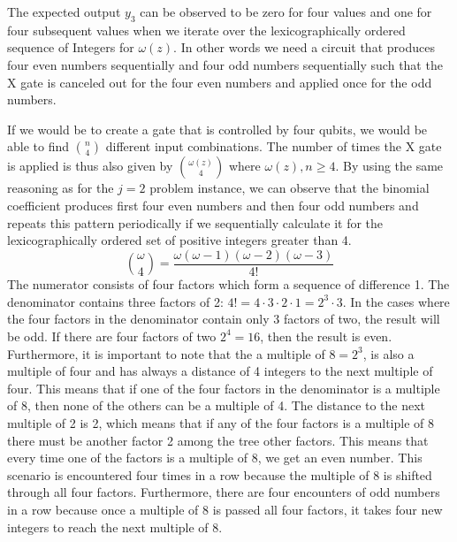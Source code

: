 \documentclass[12pt,a4paper]{article}
\begin{document}
The expected output \(y_3\) can be observed to be zero for four values and one for four subsequent values when we iterate over the lexicographically ordered sequence of Integers for \(\omega(z)\). In other words we need a circuit that produces four even numbers sequentially and four odd numbers sequentially such that the X gate is canceled out for the four even numbers and applied once for the odd numbers. 

If we would be to create a gate that is controlled by four qubits, we would be able to find \(\binom{n}{4}\) different input combinations. The number of times the X gate is applied is thus also given by \(\binom{\omega(z)}{4}\) where \(\omega(z), n \ge 4\). By using the same reasoning as for the \(j=2\) problem instance, we can observe that the binomial coefficient produces first four even numbers and then four odd numbers and repeats this pattern periodically if we sequentially calculate it for the lexicographically ordered set of positive integers greater than 4. 
\[
\binom{\omega}{4} = \frac{\omega(\omega - 1)(\omega - 2)(\omega - 3)}{4!}
\]
The numerator consists of four factors which form a sequence of difference 1. The denominator contains three factors of 2: \(4! = 4\cdot3\cdot2\cdot1 = 2^3\cdot3\). In the cases where the four factors in the denominator contain only 3 factors of two, the result will be odd. If there are four factors of two \(2^4 = 16\), then the result is even. Furthermore, it is important to note that the a multiple of \(8 = 2^3\), is also a multiple of four and has always a distance of 4 integers to the next multiple of four. This means that if one of the four factors in the denominator is a multiple of 8, then none of the others can be a multiple of 4. The distance to the next multiple of 2 is 2, which means that if any of the four factors is a multiple of 8 there must be another factor 2 among the tree other factors. This means that every time one of the factors is a multiple of 8, we get an even number. This scenario is encountered four times in a row because the multiple of 8 is shifted through all four factors. Furthermore, there are four encounters of odd numbers in a row because once a multiple of 8 is passed all four factors, it takes four new integers to reach the next multiple of 8.
\end{document}
